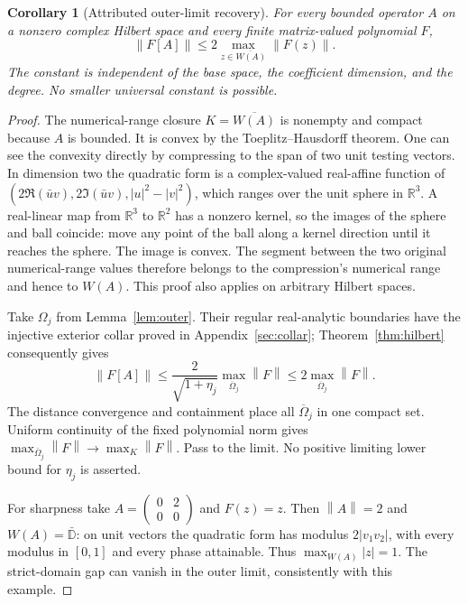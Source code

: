 \documentclass[11pt]{article}
\newtheorem{corollary}[theorem]{Corollary}
\theoremstyle{remark}\newtheorem{remark}[theorem]{Remark}
\newcommand{\R}{\mathbb R}
\newcommand{\norm}[1]{\left\lVert #1\right\rVert}
\begin{document}
\begin{corollary}[Attributed outer-limit recovery]\label{cor:complete-two}
For every bounded operator $A$ on a nonzero complex Hilbert space and every finite matrix-valued polynomial $F$,
\[
 \norm{F[A]}\le2\max_{z\in\overline{W(A)}}\norm{F(z)}.
\]
The constant is independent of the base space, the coefficient dimension, and the degree. No smaller universal constant is possible.
\end{corollary}
\begin{proof}
The numerical-range closure $K=\overline{W(A)}$ is nonempty and compact because $A$ is bounded. It is convex by the Toeplitz--Hausdorff theorem. One can see the convexity directly by compressing to the span of two unit testing vectors. In dimension two the quadratic form is a complex-valued real-affine function of
$(2\Re(\bar uv),2\Im(\bar uv),|u|^2-|v|^2)$, which ranges over the unit sphere in $\R^3$. A real-linear map from $\R^3$ to $\R^2$ has a nonzero kernel, so the images of the sphere and ball coincide: move any point of the ball along a kernel direction until it reaches the sphere. The image is convex. The segment between the two original numerical-range values therefore belongs to the compression's numerical range and hence to $W(A)$. This proof also applies on arbitrary Hilbert spaces.

Take $\Omega_j$ from Lemma~\ref{lem:outer}. Their regular real-analytic boundaries have the injective exterior collar proved in Appendix~\ref{sec:collar}; Theorem~\ref{thm:hilbert} consequently gives
\[
 \norm{F[A]}\le \frac2{\sqrt{1+\eta_j}}
 \max_{\overline\Omega_j}\norm F\le2\max_{\overline\Omega_j}\norm F.
\]
The distance convergence and containment place all $\overline\Omega_j$ in one compact set. Uniform continuity of the fixed polynomial norm gives
$\max_{\overline\Omega_j}\norm F\longrightarrow\max_K\norm F$.
Pass to the limit. No positive limiting lower bound for $\eta_j$ is asserted.

For sharpness take $A=\left(\begin{smallmatrix}0&2\\0&0\end{smallmatrix}\right)$ and $F(z)=z$.
Then $\norm A=2$ and $W(A)=\bar{\mathbb D}$: on unit vectors the quadratic form has modulus $2|v_1v_2|$, with every modulus in $[0,1]$ and every phase attainable. Thus $\max_{W(A)}|z|=1$. The strict-domain gap can vanish in the outer limit, consistently with this example.
\end{proof}
\end{document}
